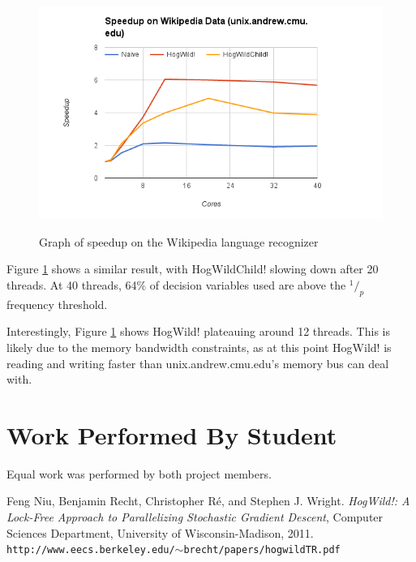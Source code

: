 \documentclass{article}
\newcommand*\rfrac[2]{{}^{#1}\!/_{#2}}
\begin{document}
\begin{figure}[h!]
\centering
\includegraphics[width=\textwidth]{img/unix_wiki_graph.png}
\label{unix-wiki}
\caption{Graph of speedup on the Wikipedia language recognizer}
\end{figure}

Figure \ref{unix-wiki} shows a similar result, with HogWildChild!
slowing down after 20 threads.
At 40 threads, 64\% of decision variables used are above the
$\rfrac 1 p$ frequency threshold.

Interestingly, Figure \ref{unix-wiki} shows HogWild! plateauing around 12
threads.
This is likely due to the memory bandwidth constraints,
as at this point HogWild! is reading and writing faster than
unix.andrew.cmu.edu's memory bus can deal with.

\section{Work Performed By Student}

Equal work was performed by both project members.

\clearpage
{}
\begin{thebibliography}{9}
Feng Niu, Benjamin Recht, Christopher R\'e, and Stephen J. Wright.
\emph{HogWild!: A Lock-Free Approach to
Parallelizing Stochastic Gradient Descent},
Computer Sciences Department, University of Wisconsin-Madison,
2011.
\texttt{http://www.eecs.berkeley.edu/$\sim$brecht/papers/hogwildTR.pdf}
\end{thebibliography}
\end{document}
